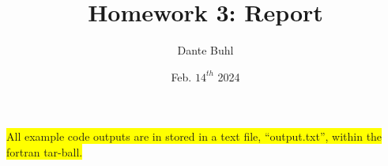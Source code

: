 \documentclass{article}
\title{Homework 3: Report}
\author{Dante Buhl}
\date{Feb. $14^{th}$ 2024}
\begin{document}
\newcommand{\bs}[1]{\boldsymbol{#1}}
\newcommand{\bmp}[1]{\begin{minipage}{#1\textwidth}}
\newcommand{\emp}{\end{minipage}}
\newcommand{\R}{\mathbb{R}}
\newcommand{\C}{\mathbb{C}}
\newcommand{\N}{\mathcal{N}}
\newcommand{\I}{\mathrm{I}}
\newcommand{\K}{\bs{\mathrm{K}}}
\newcommand{\m}{\bs{\mu}_*}
\newcommand{\s}{\bs{\Sigma}_*}
\newcommand{\dt}{\Delta t}
\newcommand{\tr}[1]{\text{Tr}(#1)}
\newcommand{\Tr}[1]{\text{Tr}(#1)}

\maketitle

\colorbox{yellow}{All example code outputs are in stored in a text file, ``output.txt'', within the fortran tar-ball.}

\setcounter{section}{1}
\end{document}
